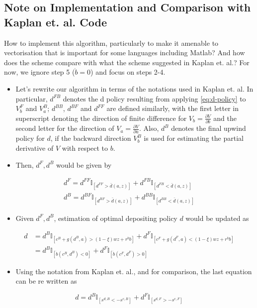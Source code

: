 \documentclass[11pt]{article}
\begin{document}
\subsection{Note on Implementation and Comparison with Kaplan et. al. Code}
\label{sec:org5b4b825}
How to implement this algorithm, particularly to make it amenable to vectorisation that is important for some languages including Matlab? And how does the scheme compare with what the scheme suggested in Kaplan et. al.? For now, we ignore step 5 (\(\dot{b} = 0\)) and focus on steps 2-4.

\begin{itemize}
\item Let's rewrite our algorithm in terms of the notations used in Kaplan et. al. In particular, \(d^{FB}\) denotes the d policy resulting from applying \eqref{eq:d-policy} to \(V_b^F\) and \(V_a^B\); \(d^{BB}\), \(d^{BF}\) and \(d^{FF}\) are defined similarly, with the first letter in superscript denoting the direction of finite difference for \(V_b = \frac{\partial V}{\partial b}\) and the second letter for the direction of \(V_a = \frac{\partial V}{\partial a}\). Also, \(d^B\) denotes the final upwind policy for \(d\), if the backward direction \(V_b^B\) is used for estimating the partial derivative of \(V\) with respect to \(b\).
\item Then, \(d^F, d^B\) would be given by
\end{itemize}
\begin{align*}
d^F = d^{FF} \mathbb{I}_{\left[d^{FF} > \bar{d}(a,z) \right]} + d^{FB} \mathbb{I}_{\left[d^{FB} < \bar{d}(a,z) \right]}\\
d^B = d^{BF} \mathbb{I}_{\left[d^{BF} > \bar{d}(a,z) \right]} + d^{BB} \mathbb{I}_{\left[d^{BB} < \bar{d}(a,z) \right]}
\end{align*}
\begin{itemize}
\item Given \(d^F, d^B\), estimation of optimal depositing policy \(d\) would be updated as
\end{itemize}
\begin{align*}
d &= d^B \mathbb{I}_{\left[ c^B + g(d^B,a) > (1-\xi) w z + r^bb \right]} + d^F \mathbb{I}_{\left[ c^F + g(d^F,a) < (1-\xi) w z + r^bb \right]} \\
&= d^B \mathbb{I}_{\left[ \dot{b} \left(c^B, d^B\right) < 0 \right]} + d^F \mathbb{I}_{\left[ \dot{b} \left(c^F, d^F\right) > 0 \right]}
\end{align*}
\begin{itemize}
\item Using the notation from Kaplan et. al., and for comparison, the last equation can be re written as
\end{itemize}
\[ d = d^B \mathbb{I}_{\left[s^{d,B}<-s^{c,B}  \right]} + d^F \mathbb{I}_{\left[ s^{d,F} > -s^{c,F} \right]}  \]
\end{document}

